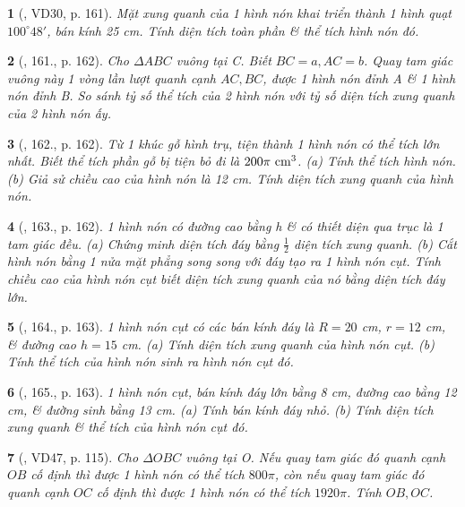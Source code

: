 \documentclass{article}
\newtheorem{baitoan}{}
\begin{document}
\begin{baitoan}[\cite{Tuyen_Toan_9_old}, VD30, p. 161]
	Mặt xung quanh của 1 hình nón khai triển thành 1 hình quạt $100^\circ48'$, bán kính {\rm25 cm}. Tính diện tích toàn phần \& thể tích hình nón đó.
\end{baitoan}

\begin{baitoan}[\cite{Tuyen_Toan_9_old}, 161., p. 162]
	Cho $\Delta ABC$ vuông tại C. Biết $BC = a,AC = b$. Quay tam giác vuông này 1 vòng lần lượt quanh cạnh $AC,BC$, được 1 hình nón đỉnh A \& 1 hình nón đỉnh B. So sánh tỷ số thể tích của 2 hình nón với tỷ số diện tích xung quanh của 2 hình nón ấy.
\end{baitoan}

\begin{baitoan}[\cite{Tuyen_Toan_9_old}, 162., p. 162]
	Từ 1 khúc gỗ hình trụ, tiện thành 1 hình nón có thể tích lớn nhất. Biết thể tích phần gỗ bị tiện bỏ đi là $200\pi\ {\rm cm}^3$. (a) Tính thể tích hình nón. (b) Giả sử chiều cao của hình nón là {\rm12 cm}. Tính diện tích xung quanh của hình nón.
\end{baitoan}

\begin{baitoan}[\cite{Tuyen_Toan_9_old}, 163., p. 162]
	1 hình nón có đường cao bằng h \& có thiết diện qua trục là 1 tam giác đều. (a) Chứng minh diện tích đáy bằng $\frac{1}{2}$ diện tích xung quanh. (b) Cắt hình nón bằng 1 nửa mặt phẳng song song với đáy tạo ra 1 hình nón cụt. Tính chiều cao của hình nón cụt biết diện tích xung quanh của nó bằng diện tích đáy lớn.
\end{baitoan}

\begin{baitoan}[\cite{Tuyen_Toan_9_old}, 164., p. 163]
	1 hình nón cụt có các bán kính đáy là $R = 20$ {\rm cm}, $r = 12$ {\rm cm}, \& đường cao $h = 15$ {\rm cm}. (a) Tính diện tích xung quanh của hình nón cụt. (b) Tính thể tích của hình nón sinh ra hình nón cụt đó.
\end{baitoan}

\begin{baitoan}[\cite{Tuyen_Toan_9_old}, 165., p. 163]
	1 hình nón cụt, bán kính đáy lớn bằng {\rm8 cm}, đường cao bằng {\rm12 cm}, \& đường sinh bằng {\rm13 cm}. (a) Tính bán kính đáy nhỏ. (b) Tính diện tích xung quanh \& thể tích của hình nón cụt đó.
\end{baitoan}

\begin{baitoan}[\cite{Binh_Toan_9_tap_2}, VD47, p. 115]
	Cho $\Delta OBC$ vuông tại O. Nếu quay tam giác đó quanh cạnh $OB$ cố định thì được 1 hình nón có thể tích $800\pi$, còn nếu quay tam giác đó quanh cạnh $OC$ cố định thì được 1 hình nón có thể tích $1920\pi$. Tính $OB,OC$.
\end{baitoan}
\end{document}
